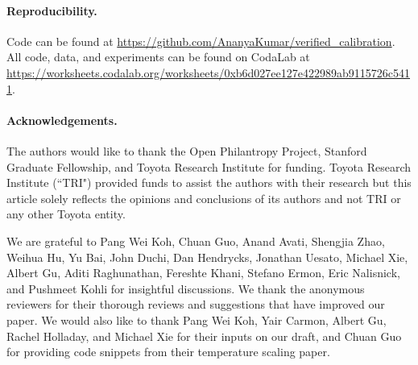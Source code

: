 
\paragraph{Reproducibility.}

Code can be found at \url{https://github.com/AnanyaKumar/verified_calibration}.
All code, data, and experiments can be found on CodaLab at \url{https://worksheets.codalab.org/worksheets/0xb6d027ee127e422989ab9115726c5411}.

\paragraph{Acknowledgements.}

The authors would like to thank the Open Philantropy Project, Stanford Graduate Fellowship, and Toyota Research Institute for funding. Toyota Research Institute (``TRI") provided funds to assist the authors with their research but this article solely reflects the opinions and conclusions of its authors and not TRI or any other Toyota entity.

We are grateful to Pang Wei Koh, Chuan Guo, Anand Avati, Shengjia Zhao, Weihua Hu, Yu Bai, John Duchi, Dan Hendrycks, Jonathan Uesato, Michael Xie, Albert Gu, Aditi Raghunathan, Fereshte Khani, Stefano Ermon, Eric Nalisnick, and Pushmeet Kohli for insightful discussions. We thank the anonymous reviewers for their thorough reviews and suggestions that have improved our paper. We would also like to thank Pang Wei Koh, Yair Carmon, Albert Gu, Rachel Holladay, and Michael Xie for their inputs on our draft, and Chuan Guo for providing code snippets from their temperature scaling paper.






